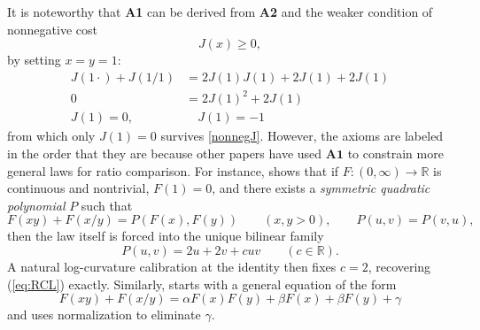 \documentclass[11pt,a4paper]{article}
\begin{document}
It is noteworthy that \textbf{A1} can be derived from \textbf{A2} and the weaker condition of nonnegative cost
\begin{equation}
    J(x)\ge0, \label{nonnegJ}
\end{equation}
by setting $x=y=1$:
\begin{align}
    J(1\cdot) + J(1/1) &= 2J(1)J(1) + 2J(1) + 2J(1)\nonumber\\
    0&=2J(1)^2+2J(1)\nonumber\\
    J(1)=0,&\quad J(1)=-1 \label{J1is0ornegative}
\end{align}
from which only $J(1)=0$ survives \ref{nonnegJ}. However, the axioms are labeled in the order that they are because other papers have used $\textbf{A1}$ to constrain more general laws for ratio comparison. For instance, \cite{DAlembertInevitability} shows that if $F:(0,\infty)\to\mathbb{R}$ is continuous and nontrivial, $F(1)=0$, and there exists a \emph{symmetric quadratic polynomial} $P$ such that
\begin{equation}
F(xy)+F(x/y)=P(F(x),F(y))\qquad(x,y>0),\qquad P(u,v)=P(v,u),
\end{equation}
then the law itself is forced into the unique bilinear family
\begin{equation}
P(u,v)=2u+2v+cuv\qquad(c\in\mathbb{R}).
\end{equation}
A natural log-curvature calibration at the identity then fixes $c=2$, recovering (\ref{eq:RCL}) exactly. Similarly, \cite{CoherentComparisonLedger} starts with a general equation of the form
\begin{equation}
    F(xy)+F(x/y)=\alpha F(x) F(y)+\beta F(x)+\beta F(y)+\gamma
\end{equation} 
and uses normalization to eliminate $\gamma$.
\end{document}
